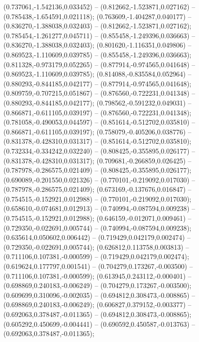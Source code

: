  (0.737061,-1.542136,0.033452) -- (0.812662,-1.523871,0.027162) -- (0.785438,-1.654591,0.021118);
 (0.763609,-1.404287,0.040177) -- (0.836270,-1.388038,0.032403) -- (0.812662,-1.523871,0.027162);
 (0.785454,-1.261277,0.045711) -- (0.855458,-1.249396,0.036663) -- (0.836270,-1.388038,0.032403);
 (0.801620,-1.116351,0.049806) -- (0.869523,-1.110609,0.039785) -- (0.855458,-1.249396,0.036663);
 (0.811328,-0.973179,0.052265) -- (0.877914,-0.974565,0.041648) -- (0.869523,-1.110609,0.039785);
 (0.814088,-0.835584,0.052964) -- (0.880293,-0.844185,0.042177) -- (0.877914,-0.974565,0.041648);
 (0.809759,-0.707215,0.051867) -- (0.876560,-0.722231,0.041348) -- (0.880293,-0.844185,0.042177);
 (0.798562,-0.591232,0.049031) -- (0.866871,-0.611105,0.039197) -- (0.876560,-0.722231,0.041348);
 (0.781058,-0.490053,0.044597) -- (0.851614,-0.512702,0.035810) -- (0.866871,-0.611105,0.039197);
 (0.758079,-0.405206,0.038776) -- (0.831378,-0.428310,0.031317) -- (0.851614,-0.512702,0.035810);
 (0.732334,-0.334242,0.032240) -- (0.808425,-0.355895,0.026177) -- (0.831378,-0.428310,0.031317);
 (0.709681,-0.266859,0.026425) -- (0.787978,-0.286575,0.021409) -- (0.808425,-0.355895,0.026177);
 (0.690089,-0.201550,0.021326) -- (0.770101,-0.219092,0.017030) -- (0.787978,-0.286575,0.021409);
 (0.673169,-0.137676,0.016847) -- (0.754515,-0.152921,0.012988) -- (0.770101,-0.219092,0.017030);
 (0.658610,-0.074681,0.012913) -- (0.740994,-0.087594,0.009238) -- (0.754515,-0.152921,0.012988);
 (0.646159,-0.012071,0.009461) -- (0.729350,-0.022691,0.005744) -- (0.740994,-0.087594,0.009238);
 (0.635614,0.050602,0.006442) -- (0.719429,0.042179,0.002474) -- (0.729350,-0.022691,0.005744);
 (0.626812,0.113758,0.003813) -- (0.711106,0.107381,-0.000599) -- (0.719429,0.042179,0.002474);
 (0.619624,0.177797,0.001541) -- (0.704279,0.173267,-0.003500) -- (0.711106,0.107381,-0.000599);
 (0.613945,0.243112,-0.000401) -- (0.698869,0.240183,-0.006249) -- (0.704279,0.173267,-0.003500);
 (0.609699,0.310096,-0.002035) -- (0.694812,0.308473,-0.008865) -- (0.698869,0.240183,-0.006249);
 (0.606827,0.379152,-0.003377) -- (0.692063,0.378487,-0.011365) -- (0.694812,0.308473,-0.008865);
 (0.605292,0.450699,-0.004441) -- (0.690592,0.450587,-0.013763) -- (0.692063,0.378487,-0.011365);
